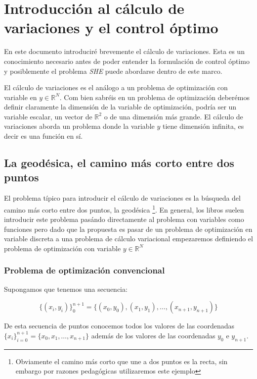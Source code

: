 \chapter{Introducción al cálculo de variaciones y el control óptimo}
En este documento introduciré brevemente el cálculo de variaciones. Esta es un conocimiento necesario antes de poder entender la formulación de control óptimo y posiblemente el problema \emph{SHE} puede abordarse dentro de este marco. 

El cálculo de variaciones es el análogo a un problema de optimización con variable en $ y\in \mathbb{R}^N $. Com bien sabréis en un problema de optimización deberémos definir claramente la dimensión de la variable de optimización, podría ser un variable escalar, un vector de $\mathbb{R}^2$ o de una dimensión más grande. El cálculo de variaciones aborda un problema donde la variable $y$ tiene dimensión infinita, es decir es una función en sí. 

\section{La geodésica, el camino más corto entre dos puntos }

El problema típico para introducir el cálculo de variaciones es la búsqueda del camino más corto entre dos puntos, la geodésica \footnote{Obviamente el camino más corto que une a dos puntos es la recta, sin embargo por razones pedagógicas utilizaremos este ejemplo}. En general, los libros  suelen introducir este problema pasándo directamente al problema con variables como funciones pero dado que la propuesta es pasar de un problema de optimización en variable discreta a una problema de cálculo variacional empezaremos definiendo el problema de optimización con variable $y \in \mathbb{R}^N$


\subsection{Problema de optimización convencional}

Supongamos que tenemos una secuencia:

\begin{equation}
        \{(x_i,y_i) \}_{0}^{n+1} = \{ (x_0,y_0),(x_1,y_1),\dots,(x_{n+1},y_{n+1})\}
\end{equation}
 
De esta secuencia de puntos conocemos todos los valores de las coordenadas $\{ x_i \}_{i=0}^{n+1} = \{x_0,x_1,\dots,x_{n+1}\}$ además de los valores de las coordenadas  $y_0$ e $y_{n+1}$. 

